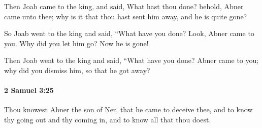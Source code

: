 			\begin{versebox}
					\item[BHS] 
					\item[ASV] Then Joab came to the king, and said, What hast thou done? behold, Abner came unto thee; why is it that thou hast sent him away, and he is quite gone?
					\item[NIV] So Joab went to the king and said, “What have you done? Look, Abner came to you. Why did you let him go? Now he is gone!
					\item[NRSV] Then Joab went to the king and said, “What have you done? Abner came to you; why did you dismiss him, so that he got away?
			\end{versebox}

		\paragraph{2 Samuel 3:25} %
			\label{2SAMUEL-3-25}

			Thou knowest Abner the son of Ner, that he came to deceive thee, and to know thy going out and thy coming in, and to know all that thou doest.

